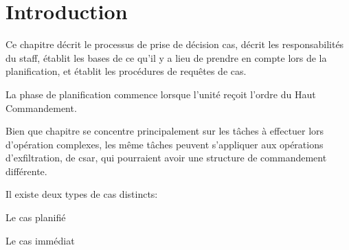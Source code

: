 \section{Introduction}

Ce chapitre décrit le processus de prise de décision \gls{cas}, décrit les responsabilités du staff, établit les bases de ce qu'il y a lieu de prendre en compte lors de la planification, et établit les procédures de requêtes de \gls{cas}.

La phase de planification commence lorsque l'unité reçoit l'ordre du Haut Commandement.

Bien que chapitre se concentre principalement sur les tâches à effectuer lors d'opération complexes, les même tâches peuvent s'appliquer aux opérations d'exfiltration, de \gls{csar}, qui pourraient avoir une structure de commandement différente.


\e
    \item Il existe deux types de \gls{cas} distincts:
    \ee
        \item Le \gls{cas} planifié
        \item Le \gls{cas} immédiat
    \ed
\ed